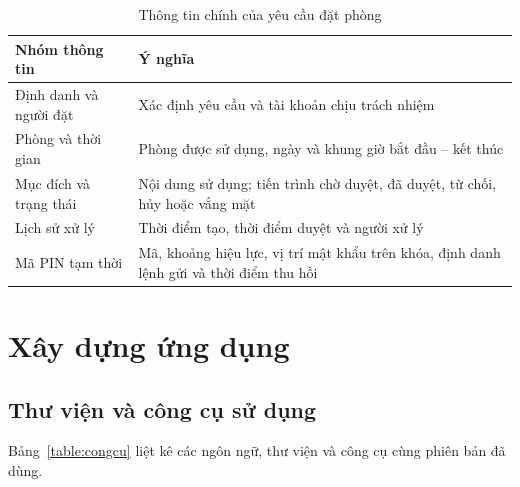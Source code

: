 \documentclass[../DoAn.tex]{subfiles}
\begin{document}
\begin{table}[H]
\centering\small
\renewcommand{\arraystretch}{1.1}
\caption{Thông tin chính của yêu cầu đặt phòng}
\label{tab:bookings}
\begin{tabularx}{\textwidth}{|p{4.2cm}|X|}
\hline
\textbf{Nhóm thông tin} & \textbf{Ý nghĩa} \\ \hline
Định danh và người đặt & Xác định yêu cầu và tài khoản chịu trách nhiệm \\ \hline
Phòng và thời gian & Phòng được sử dụng, ngày và khung giờ bắt đầu -- kết thúc \\ \hline
Mục đích và trạng thái & Nội dung sử dụng; tiến trình chờ duyệt, đã duyệt, từ chối, hủy hoặc vắng mặt \\ \hline
Lịch sử xử lý & Thời điểm tạo, thời điểm duyệt và người xử lý \\ \hline
Mã PIN tạm thời & Mã, khoảng hiệu lực, vị trí mật khẩu trên khóa, định danh lệnh gửi và thời điểm thu hồi \\ \hline
\end{tabularx}
\end{table}

\section{Xây dựng ứng dụng}
\subsection{Thư viện và công cụ sử dụng}
Bảng~\ref{table:congcu} liệt kê các ngôn ngữ, thư viện và công cụ cùng phiên bản đã dùng.
\end{document}
